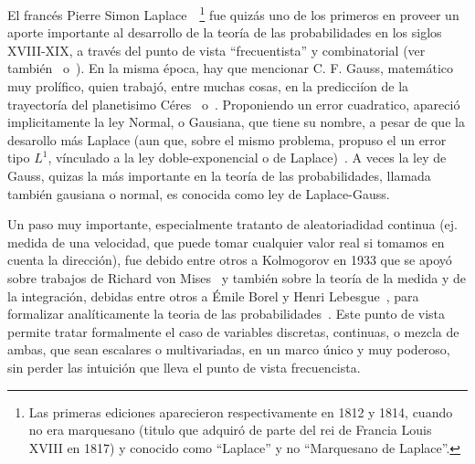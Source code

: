 {%
%
El  franc\'es Pierre  Simon  Laplace~\cite{Lap20, Lap40}~\footnote{Las  primeras
ediciones aparecieron respectivamente  en 1812 y 1814, cuando  no era marquesano
(titulo  que adquir\'o  de  parte del  rei de  Francia  Louis XVIII  en 1817)  y
conocido como ``Laplace'' y no  ``Marquesano de Laplace''.}  fue quiz\'as uno de
los primeros en proveer un aporte importante al desarrollo de la teor\'ia de las
probabilidades  en  los  siglos  XVIII-XIX,   a  trav\'es  del  punto  de  vista
``frecuentista'' y combinatorial (ver tambi\'en~\cite[Caps.~13, 15 \&~22]{Hal90}
o~\cite{DavEdw01,  Hal06}).  En  la  misma  \'epoca, hay  que  mencionar C.   F.
Gauss, matem\'atico muy prol\'ifico, quien  trabaj\'o, entre muchas cosas, en la
predicci\'ion  de la trayector\'ia  del planetisimo  C\'eres~\cite{Gau09, Gau10}
o~\cite[Cap.~7]{Hal06}.     Proponiendo   un   error    cuadratico,   apareci\'o
implicitamente la ley Normal, o Gausiana, que tiene su nombre, a pesar de que la
desarollo m\'as Laplace  (aun que, sobre el mismo problema,  propuso el un error
tipo $L^1$,  v\'inculado a la  ley doble-exponencial o  de Laplace)~\cite{Lap09,
Lap09:Supp, Lap20}.  A  veces la ley de Gauss, quizas la  m\'as importante en la
teor\'ia de las probabilidades, llamada tambi\'en gausiana o normal, es conocida
como ley de Laplace-Gauss.

Un  paso  muy  importante,  especialmente tratanto  de  aleatoriadidad  continua
(ej. medida de una velocidad, que puede tomar cualquier valor real si tomamos en
cuenta  la direcci\'on),  fue debido  entre otros  a Kolmogorov  en 1933  que se
apoy\'o sobre  trabajos de Richard  von Mises~\cite{Mis32} y tambi\'en  sobre la
teor\'ia de la medida y de la integraci\'on, debidas entre otros a \'Emile Borel
y  Henri  Lebesgue~\cite{Bor98, Bor09,  Leb04,  Leb18,  Hal50}, para  formalizar
anal\'iticamente   la  teoria   de  las   probabilidades~\cite{Kol56,  BarNov78,
JacPro03}. Este punto  de vista permite tratar formalmente  el caso de variables
discretas, continuas, o mezcla de  ambas, que sean escalares o multivariadas, en
un marco \'unico  y muy poderoso, sin perder las intuici\'on  que lleva el punto
de vista frecuencista.

}

